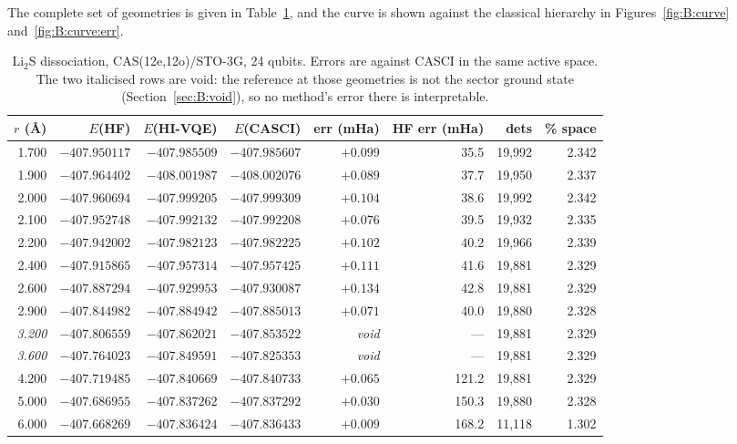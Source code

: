 \documentclass[11pt,a4paper]{article}
\newcommand{\LiS}{\texorpdfstring{Li$_2$S}{Li2S}}
\begin{document}
The complete set of geometries is given in Table~\ref{tab:B:curve}, and the
curve is shown against the classical hierarchy in
Figures~\ref{fig:B:curve} and~\ref{fig:B:curve:err}.

\begin{table}[htbp]
\centering
\small
\caption{\LiS{} dissociation, CAS(12e,12o)/STO-3G, 24 qubits. Errors are
against CASCI in the same active space. The two italicised rows are void: the
reference at those geometries is not the sector ground state
(Section~\ref{sec:B:void}), so no method's error there is interpretable.}
\label{tab:B:curve}
\begin{tabular}{@{}rrrrrrrr@{}}
\toprule
$r$ (\AA) & $E$(HF) & $E$(HI-VQE) & $E$(CASCI) & err (mHa) & HF err (mHa) & dets & \% space \\
\midrule
1.700 & $-407.950117$ & $-407.985509$ & $-407.985607$ & $+0.099$ & 35.5 & 19{,}992 & 2.342 \\
1.900 & $-407.964402$ & $-408.001987$ & $-408.002076$ & $+0.089$ & 37.7 & 19{,}950 & 2.337 \\
2.000 & $-407.960694$ & $-407.999205$ & $-407.999309$ & $+0.104$ & 38.6 & 19{,}992 & 2.342 \\
2.100 & $-407.952748$ & $-407.992132$ & $-407.992208$ & $+0.076$ & 39.5 & 19{,}932 & 2.335 \\
2.200 & $-407.942002$ & $-407.982123$ & $-407.982225$ & $+0.102$ & 40.2 & 19{,}966 & 2.339 \\
2.400 & $-407.915865$ & $-407.957314$ & $-407.957425$ & $+0.111$ & 41.6 & 19{,}881 & 2.329 \\
2.600 & $-407.887294$ & $-407.929953$ & $-407.930087$ & $+0.134$ & 42.8 & 19{,}881 & 2.329 \\
2.900 & $-407.844982$ & $-407.884942$ & $-407.885013$ & $+0.071$ & 40.0 & 19{,}880 & 2.328 \\
\midrule
\emph{3.200} & \emph{$-407.806559$} & \emph{$-407.862021$} & \emph{$-407.853522$} & \emph{void} & --- & 19{,}881 & 2.329 \\
\emph{3.600} & \emph{$-407.764023$} & \emph{$-407.849591$} & \emph{$-407.825353$} & \emph{void} & --- & 19{,}881 & 2.329 \\
\midrule
4.200 & $-407.719485$ & $-407.840669$ & $-407.840733$ & $+0.065$ & 121.2 & 19{,}881 & 2.329 \\
5.000 & $-407.686955$ & $-407.837262$ & $-407.837292$ & $+0.030$ & 150.3 & 19{,}880 & 2.328 \\
6.000 & $-407.668269$ & $-407.836424$ & $-407.836433$ & $+0.009$ & 168.2 & 11{,}118 & 1.302 \\
\bottomrule
\end{tabular}
\end{table}
\end{document}
